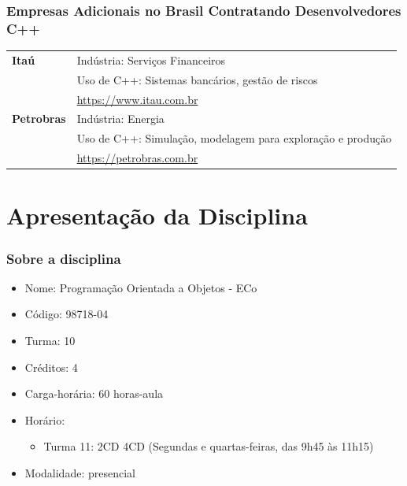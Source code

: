 \documentclass[aspectratio=169]{beamer}
\begin{document}
\begin{frame}
    \frametitle{Empresas Adicionais no Brasil Contratando Desenvolvedores C++}

    \small
    \begin{tabular}{p{} p{}}
        \textbf{Itaú} & 
        Indústria: Serviços Financeiros \\
        & Uso de C++: Sistemas bancários, gestão de riscos \\
        & \url{https://www.itau.com.br} \\ \hline
        
        \textbf{Petrobras} & 
        Indústria: Energia \\
        & Uso de C++: Simulação, modelagem para exploração e produção \\
        & \url{https://petrobras.com.br} \\
    \end{tabular}
\end{frame}

\section{Apresenta\c{c}\~ao da Disciplina}


\begin{frame}\frametitle{Sobre a disciplina}
\begin{itemize}
	\item Nome: Programação Orientada a Objetos - ECo
	\item Código: 98718-04
	\item Turma: 10
	\item Cr\'editos: 4
	\item Carga-horária: 60 horas-aula
	\item Hor\'ario:
	\begin{itemize}
		\item Turma 11: 2CD 4CD (Segundas e quartas-feiras, das 9h45 às 11h15)
	\end{itemize}
	\item Modalidade: presencial
\end{itemize}
\end{frame}
\end{document}
